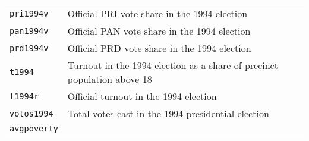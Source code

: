 \documentclass[]{article}
\begin{document}
\begin{longtable}[c]{@{}ll@{}}
\begin{minipage}[t]{0.25\columnwidth}
\texttt{pri1994v}
\end{minipage} & \begin{minipage}[t]{0.68\columnwidth}\raggedright
Official PRI vote share in the 1994 election
\end{minipage}
\\\addlinespace
\begin{minipage}[t]{0.25\columnwidth}\raggedright
\texttt{pan1994v}
\end{minipage} & \begin{minipage}[t]{0.68\columnwidth}\raggedright
Official PAN vote share in the 1994 election
\end{minipage}
\\\addlinespace
\begin{minipage}[t]{0.25\columnwidth}\raggedright
\texttt{prd1994v}
\end{minipage} & \begin{minipage}[t]{0.68\columnwidth}\raggedright
Official PRD vote share in the 1994 election
\end{minipage}
\\\addlinespace
\begin{minipage}[t]{0.25\columnwidth}\raggedright
\texttt{t1994}
\end{minipage} & \begin{minipage}[t]{0.68\columnwidth}\raggedright
Turnout in the 1994 election as a share of precinct population above 18
\end{minipage}
\\\addlinespace
\begin{minipage}[t]{0.25\columnwidth}\raggedright
\texttt{t1994r}
\end{minipage} & \begin{minipage}[t]{0.68\columnwidth}\raggedright
Official turnout in the 1994 election
\end{minipage}
\\\addlinespace
\begin{minipage}[t]{0.25\columnwidth}\raggedright
\texttt{votos1994}
\end{minipage} & \begin{minipage}[t]{0.68\columnwidth}\raggedright
Total votes cast in the 1994 presidential election
\end{minipage}
\\\addlinespace
\begin{minipage}[t]{0.25\columnwidth}\raggedright
\texttt{avgpoverty}
\end{minipage} & \begin{minipage}[t]{0.68\columnwidth}\raggedright

\end{minipage}
\end{longtable}
\end{document}
